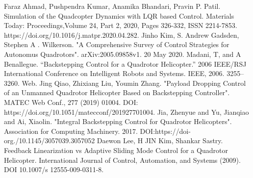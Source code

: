 \documentclass{article}
\begin{document}
\label{References}

\begin{thebibliography}{10}
Faraz Ahmad, Pushpendra Kumar, Anamika Bhandari, Pravin P. Patil.
Simulation of the Quadcopter Dynamics with LQR based Control.
Materials Today: Proceedings,Volume 24, Part 2, 2020, Pages 326-332,
ISSN 2214-7853.
https://doi.org/10.1016/j.matpr.2020.04.282.
Jinho Kim, S. Andrew Gadsden, Stephen A . Wilkerson.
"A Comprehensive Survey of Control Strategies for Autonomus Quadrotors".
arXiv:2005.09858v1.
20 May 2020.
Madani, T, and A Benallegue.
“Backstepping Control for a Quadrotor Helicopter.” 
2006 IEEE/RSJ International Conference on Intelligent Robots and Systems. 
IEEE, 2006. 3255–3260. Web.
Jing Qiao, Zhixiang Liu, Youmin Zhang. "Payload Dropping Control of an Unmanned Quadrotor Helicopter Based on Backstepping Controller".
MATEC Web Conf., 277 (2019) 01004.
DOI: https://doi.org/10.1051/matecconf/201927701004.
Jia, Zhenyue and Yu, Jianqiao and Ai, Xiaolin.
"Integral Backstepping Control for Quadrotor Helicopters".
Association for Computing Machinery.
2017.
DOI:https://doi-org./10.1145/3057039.3057052
Daewon Lee, H JIN Kim, Shankar Sastry.  
Feedback Linearization vs Adaptive Sliding Mode Control for a Quadrotor Helicopter. 
International Journal of Control, Automation, and Systems (2009). DOI 10.1007/s 12555-009-0311-8.
\end{thebibliography}
\end{document}
